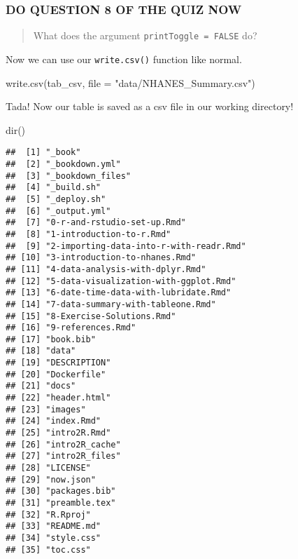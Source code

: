 \documentclass[
]{book}
\newenvironment{Shaded}{\begin{snugshade}}{\end{snugshade}}
\newcommand{\AttributeTok}[1]{\textcolor[rgb]{0.77,0.63,0.00}{#1}}
\newcommand{\FunctionTok}[1]{\textcolor[rgb]{0.00,0.00,0.00}{#1}}
\newcommand{\NormalTok}[1]{#1}
\newcommand{\StringTok}[1]{\textcolor[rgb]{0.31,0.60,0.02}{#1}}
\begin{document}
\hypertarget{do-question-8-of-the-quiz-now-3}{%
\subsubsection{DO QUESTION 8 OF THE QUIZ NOW}\label{do-question-8-of-the-quiz-now-3}}

\begin{quote}
What does the argument \texttt{printToggle\ =\ FALSE} do?
\end{quote}

Now we can use our \texttt{write.csv()} function like normal.

\begin{Shaded}
\begin{Highlighting}[]
\FunctionTok{write.csv}\NormalTok{(tab\_csv, }\AttributeTok{file =} \StringTok{"data/NHANES\_Summary.csv"}\NormalTok{)}
\end{Highlighting}
\end{Shaded}

Tada! Now our table is saved as a csv file in our working directory!

\begin{Shaded}
\begin{Highlighting}[]
\FunctionTok{dir}\NormalTok{()}
\end{Highlighting}
\end{Shaded}

\begin{verbatim}
##  [1] "_book"                                 
##  [2] "_bookdown.yml"                         
##  [3] "_bookdown_files"                       
##  [4] "_build.sh"                             
##  [5] "_deploy.sh"                            
##  [6] "_output.yml"                           
##  [7] "0-r-and-rstudio-set-up.Rmd"            
##  [8] "1-introduction-to-r.Rmd"               
##  [9] "2-importing-data-into-r-with-readr.Rmd"
## [10] "3-introduction-to-nhanes.Rmd"          
## [11] "4-data-analysis-with-dplyr.Rmd"        
## [12] "5-data-visualization-with-ggplot.Rmd"  
## [13] "6-date-time-data-with-lubridate.Rmd"   
## [14] "7-data-summary-with-tableone.Rmd"      
## [15] "8-Exercise-Solutions.Rmd"              
## [16] "9-references.Rmd"                      
## [17] "book.bib"                              
## [18] "data"                                  
## [19] "DESCRIPTION"                           
## [20] "Dockerfile"                            
## [21] "docs"                                  
## [22] "header.html"                           
## [23] "images"                                
## [24] "index.Rmd"                             
## [25] "intro2R.Rmd"                           
## [26] "intro2R_cache"                         
## [27] "intro2R_files"                         
## [28] "LICENSE"                               
## [29] "now.json"                              
## [30] "packages.bib"                          
## [31] "preamble.tex"                          
## [32] "R.Rproj"                               
## [33] "README.md"                             
## [34] "style.css"                             
## [35] "toc.css"
\end{verbatim}
\end{document}
